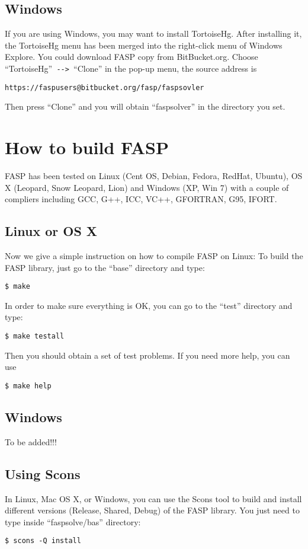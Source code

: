 \documentclass[11pt]{memoir}
\begin{document}
\subsection{Windows}
If you are using Windows, you may want to install TortoiseHg. After installing it, the TortoiseHg menu has been merged into the right-click menu of Windows Explore. You could download FASP copy from BitBucket.org. Choose ``TortoiseHg''\verb| --> |``Clone'' in the pop-up menu, the source address is
\begin{lstlisting}[numbers=none]
https://faspusers@bitbucket.org/fasp/faspsovler
\end{lstlisting}
Then press ``Clone'' and you will obtain ``faspsolver'' in the directory you set.


\section{How to build FASP}\label{sec:build}

FASP has been tested on Linux (Cent OS, Debian, Fedora, RedHat, Ubuntu), OS X (Leopard, Snow Leopard, Lion) and Windows (XP, Win 7) with a couple of compliers including GCC, G++, ICC, VC++, GFORTRAN, G95, IFORT. 

\subsection{Linux or OS X}

Now we give a simple instruction on how to compile FASP on Linux: To build the FASP library, just go to the ``base'' directory and type:
%
\begin{lstlisting}[numbers=none]
$ make
\end{lstlisting}
%
In order to make sure everything is OK, you can go to the ``test'' directory and type:
%
\begin{lstlisting}[numbers=none]
$ make testall
\end{lstlisting}
%
Then you should obtain a set of test problems. If you need more help, you can use
%
\begin{lstlisting}[numbers=none]
$ make help
\end{lstlisting}

\subsection{Windows}

To be added!!!

\subsection{Using Scons}
In Linux, Mac OS X, or Windows, you can use the Scons tool to build and install different versions (Release, Shared, Debug) of the FASP library. You just need to type inside ``faspsolve/bas'' directory:
%
\begin{lstlisting}[numbers=none]
$ scons -Q install
\end{lstlisting}
\end{document}
